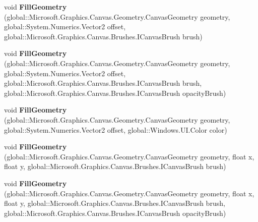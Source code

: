\begin{DoxyCompactItemize}
\item 
\mbox{\label{interface_microsoft_1_1_graphics_1_1_canvas_1_1_i_canvas_drawing_session_ac7cd0712093d632275d47aa35f415c90}} 
void {\bfseries Fill\+Geometry} (global\+::\+Microsoft.\+Graphics.\+Canvas.\+Geometry.\+Canvas\+Geometry geometry, global\+::\+System.\+Numerics.\+Vector2 offset, global\+::\+Microsoft.\+Graphics.\+Canvas.\+Brushes.\+I\+Canvas\+Brush brush)
\item 
\mbox{\label{interface_microsoft_1_1_graphics_1_1_canvas_1_1_i_canvas_drawing_session_a8e11f86d630ec14be49378fa73e606f4}} 
void {\bfseries Fill\+Geometry} (global\+::\+Microsoft.\+Graphics.\+Canvas.\+Geometry.\+Canvas\+Geometry geometry, global\+::\+System.\+Numerics.\+Vector2 offset, global\+::\+Microsoft.\+Graphics.\+Canvas.\+Brushes.\+I\+Canvas\+Brush brush, global\+::\+Microsoft.\+Graphics.\+Canvas.\+Brushes.\+I\+Canvas\+Brush opacity\+Brush)
\item 
\mbox{\label{interface_microsoft_1_1_graphics_1_1_canvas_1_1_i_canvas_drawing_session_a92c920f0c794ca240e536d0e69a55b36}} 
void {\bfseries Fill\+Geometry} (global\+::\+Microsoft.\+Graphics.\+Canvas.\+Geometry.\+Canvas\+Geometry geometry, global\+::\+System.\+Numerics.\+Vector2 offset, global\+::\+Windows.\+U\+I.\+Color color)
\item 
\mbox{\label{interface_microsoft_1_1_graphics_1_1_canvas_1_1_i_canvas_drawing_session_a07bd3aab9585c05ebbc01dc5e518028e}} 
void {\bfseries Fill\+Geometry} (global\+::\+Microsoft.\+Graphics.\+Canvas.\+Geometry.\+Canvas\+Geometry geometry, float x, float y, global\+::\+Microsoft.\+Graphics.\+Canvas.\+Brushes.\+I\+Canvas\+Brush brush)
\item 
\mbox{\label{interface_microsoft_1_1_graphics_1_1_canvas_1_1_i_canvas_drawing_session_a20a20425b22d291b0f3ac5321f4fe94b}} 
void {\bfseries Fill\+Geometry} (global\+::\+Microsoft.\+Graphics.\+Canvas.\+Geometry.\+Canvas\+Geometry geometry, float x, float y, global\+::\+Microsoft.\+Graphics.\+Canvas.\+Brushes.\+I\+Canvas\+Brush brush, global\+::\+Microsoft.\+Graphics.\+Canvas.\+Brushes.\+I\+Canvas\+Brush opacity\+Brush)

\end{DoxyCompactItemize}
